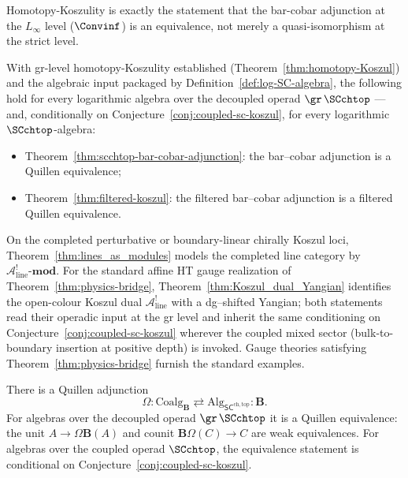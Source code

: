 \begin{remark}
\label{rem:hkoszul-two-level}
Homotopy-Koszulity is exactly the statement that the bar-cobar
adjunction at the $L_\infty$ level ($\Convinf$) is an equivalence,
not merely a quasi-isomorphism at the strict level.
\end{remark}

\begin{remark}
\label{rmk:hKoszul-dependence}
With gr-level homotopy-Koszulity established
(Theorem~\ref{thm:homotopy-Koszul}) and the algebraic input
packaged by Definition~\ref{def:log-SC-algebra}, the following hold
for every logarithmic algebra over the decoupled operad
$\gr\,\SCchtop$ --- and, conditionally on
Conjecture~\ref{conj:coupled-sc-koszul}, for every logarithmic
$\SCchtop$-algebra:
\begin{itemize}
\item Theorem~\ref{thm:scchtop-bar-cobar-adjunction}:
 the bar--cobar adjunction is a Quillen equivalence;
\item Theorem~\ref{thm:filtered-koszul}:
 the filtered bar--cobar adjunction is a filtered Quillen equivalence.
\end{itemize}
On the completed perturbative or boundary-linear chirally Koszul loci,
Theorem~\ref{thm:lines_as_modules} models the completed line category
by $\mathcal A^!_{\mathrm{line}}\text{-}\mathbf{mod}$. For the standard
affine HT gauge realization of Theorem~\ref{thm:physics-bridge},
Theorem~\ref{thm:Koszul_dual_Yangian} identifies the open-colour
Koszul dual $\mathcal A^!_{\mathrm{line}}$ with a dg--shifted Yangian;
both statements read their operadic input at the gr level and
inherit the same conditioning on
Conjecture~\ref{conj:coupled-sc-koszul} wherever the coupled mixed
sector (bulk-to-boundary insertion at positive depth) is invoked.
Gauge theories satisfying Theorem~\ref{thm:physics-bridge} furnish
the standard examples.
\end{remark}

\begin{theorem}
\label{thm:scchtop-bar-cobar-adjunction}
There is a Quillen adjunction
\[
\Omega: \mathrm{Coalg}_{\mathbf B}\rightleftarrows \mathrm{Alg}_{\mathsf{SC}^{\mathrm{ch,top}}}:\mathbf B .
\]
For algebras over the decoupled operad $\gr\,\SCchtop$ it is a
Quillen equivalence: the unit
$A\to\Omega\mathbf B(A)$ and counit $\mathbf B\Omega(C)\to C$ are
weak equivalences. For algebras over the coupled operad
$\SCchtop$, the equivalence statement is conditional on
Conjecture~\ref{conj:coupled-sc-koszul}.
\end{theorem}


